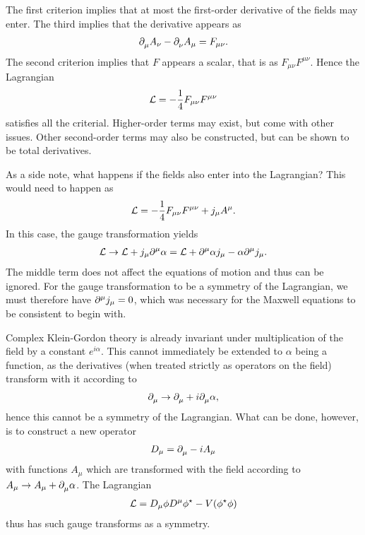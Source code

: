 The first criterion implies that at most the first-order derivative of the fields may enter. The third implies that the derivative appears as
\begin{align*}
	\partial^{}_{\mu}{A_{\nu}} - \partial^{}_{\nu}{A_{\mu}} = F_{\mu\nu}.
\end{align*}
The second criterion implies that $F$ appears a scalar, that is as $F_{\mu\nu}F^{\mu\nu}$. Hence the Lagrangian
\begin{align*}
	\mathcal{L} = -\frac{1}{4}F_{\mu\nu}F^{\mu\nu}
\end{align*}
satisfies all the criterial. Higher-order terms may exist, but come with other issues. Other second-order terms may also be constructed, but can be shown to be total derivatives.

As a side note, what happens if the fields also enter into the Lagrangian? This would need to happen as
\begin{align*}
	\mathcal{L} = -\frac{1}{4}F_{\mu\nu}F^{\mu\nu} + j_{\mu}A^{\mu}.
\end{align*}
In this case, the gauge transformation yields
\begin{align*}
	\mathcal{L} \to \mathcal{L} + j_{\mu}\partial^{\mu}_{}{\alpha} = \mathcal{L} + \partial^{\mu}_{}{\alpha j_{\mu}} - \alpha\partial^{\mu}_{}{j_{\mu}}.
\end{align*}
The middle term does not affect the equations of motion and thus can be ignored. For the gauge transformation to be a symmetry of the Lagrangian, we must therefore have $\partial^{\mu}_{}{j_{\mu}} = 0$, which was necessary for the Maxwell equations to be consistent to begin with.

Complex Klein-Gordon theory is already invariant under multiplication of the field by a constant $e^{i\alpha}$. This cannot immediately be extended to $\alpha$ being a function, as the derivatives (when treated strictly as operators on the field) transform with it according to
\begin{align*}
	\partial^{}_{\mu}{} \to \partial^{}_{\mu}{} + i\partial^{}_{\mu}{\alpha},
\end{align*}
hence this cannot be a symmetry of the Lagrangian. What can be done, however, is to construct a new operator
\begin{align*}
	D_{\mu} = \partial^{}_{\mu}{} - iA_{\mu}
\end{align*}
with functions $A_{\mu}$ which are transformed with the field according to $A_{\mu} \to A_{\mu} + \partial^{}_{\mu}{\alpha}$. The Lagrangian
\begin{align*}
	\mathcal{L} = D_{\mu}\phi D^{\mu}\phi^{\star} - V(\phi^{\star}\phi)
\end{align*}
thus has such gauge transforms as a symmetry.

